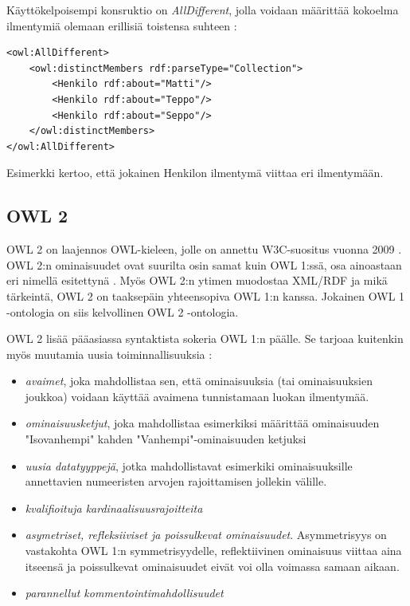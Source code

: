 \documentclass[finnish]{tktltiki2}
\theoremstyle{definition}
\theoremstyle{remark}
\begin{document}
Käyttökelpoisempi konsruktio on \textit{AllDifferent}, jolla voidaan määrittää kokoelma ilmentymiä olemaan erillisiä toistensa suhteen \cite{SWM04}:
\begin{verbatim}
<owl:AllDifferent>
    <owl:distinctMembers rdf:parseType="Collection">
        <Henkilo rdf:about="Matti"/>
        <Henkilo rdf:about="Teppo"/>
        <Henkilo rdf:about="Seppo"/>
    </owl:distinctMembers>
</owl:AllDifferent>
\end{verbatim}
Esimerkki kertoo, että jokainen Henkilon ilmentymä viittaa eri ilmentymään. 

\subsection{OWL 2}
OWL 2 on laajennos OWL-kieleen, jolle on annettu W3C-suositus vuonna 2009 \cite{OWL2}. OWL 2:n ominaisuudet ovat suurilta osin samat kuin OWL 1:ssä, osa ainoastaan eri nimellä esitettynä . Myös OWL 2:n ytimen muodostaa XML/RDF ja mikä tärkeintä, OWL 2 on taaksepäin yhteensopiva OWL 1:n kanssa. Jokainen OWL 1 -ontologia on siis kelvollinen OWL 2 -ontologia.  

OWL 2 lisää pääasiassa syntaktista sokeria OWL 1:n päälle. Se tarjoaa kuitenkin myös muutamia uusia toiminnallisuuksia \cite{OWL2}: 
\begin{itemize}
\item \textit{avaimet}, joka mahdollistaa sen, että ominaisuuksia (tai ominaisuuksien joukkoa) voidaan käyttää avaimena tunnistamaan luokan ilmentymää.
\item \textit{ominaisuusketjut}, joka mahdollistaa esimerkiksi määrittää ominaisuuden "Isovanhempi" kahden "Vanhempi"-ominaisuuden ketjuksi
\item \textit{uusia datatyyppejä}, jotka mahdollistavat esimerkiki ominaisuuksille annettavien numeeristen arvojen rajoittamisen jollekin välille. 
\item \textit{kvalifioituja kardinaalisuusrajoitteita}
\item \textit{asymetriset, refleksiiviset ja poissulkevat ominaisuudet}. Asymmetrisyys on vastakohta OWL 1:n symmetrisyydelle, reflektiivinen ominaisuus viittaa aina itseensä ja poissulkevat ominaisuudet eivät voi olla voimassa samaan aikaan. 
\item \textit{parannellut kommentointimahdollisuudet}  
\end{itemize}




%
%
% 
%
\newpage



\end{document}
